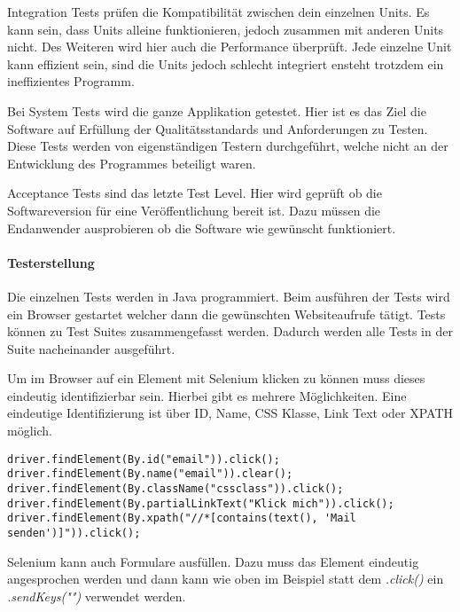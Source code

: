 \newpage

Integration Tests prüfen die Kompatibilität zwischen dein einzelnen Units. Es kann sein, dass Units alleine funktionieren, jedoch zusammen mit anderen Units nicht. Des Weiteren wird hier auch die Performance überprüft. Jede einzelne Unit kann effizient sein, sind die Units jedoch schlecht integriert ensteht trotzdem ein ineffizientes Programm. \cite{TESTING3}

Bei System Tests wird die ganze Applikation getestet. Hier ist es das Ziel die Software auf  Erfüllung der Qualitätsstandards und Anforderungen zu Testen. Diese Tests werden von eigenständigen Testern durchgeführt, welche nicht an der Entwicklung des Programmes beteiligt waren. \cite{TESTING3}

Acceptance Tests sind das letzte Test Level. Hier wird geprüft ob die Softwareversion für eine Veröffentlichung bereit ist. Dazu müssen die Endanwender ausprobieren ob die Software wie gewünscht funktioniert. \cite{TESTING3}

\paragraph{Testerstellung}
Die einzelnen Tests werden in Java programmiert. Beim ausführen der Tests wird ein Browser gestartet welcher dann die gewünschten Websiteaufrufe tätigt. Tests können zu Test Suites zusammengefasst werden. Dadurch werden alle Tests in der Suite nacheinander ausgeführt. 

Um im Browser auf ein Element mit Selenium klicken zu können muss dieses eindeutig identifizierbar sein. Hierbei gibt es mehrere Möglichkeiten. Eine eindeutige Identifizierung ist über ID, Name, CSS Klasse, Link Text oder XPATH möglich. 

\begin{lstlisting}[caption = Selenium Element Selektoren, label = testing1]
driver.findElement(By.id("email")).click();
driver.findElement(By.name("email")).clear();
driver.findElement(By.className("cssclass")).click();
driver.findElement(By.partialLinkText("Klick mich")).click();
driver.findElement(By.xpath("//*[contains(text(), 'Mail senden')]")).click();
\end{lstlisting}

Selenium kann auch Formulare ausfüllen. Dazu muss das Element eindeutig angesprochen werden und dann kann wie oben im Beispiel statt dem \textit{.click()} ein \textit{.sendKeys("")} verwendet werden. 

\newpage

